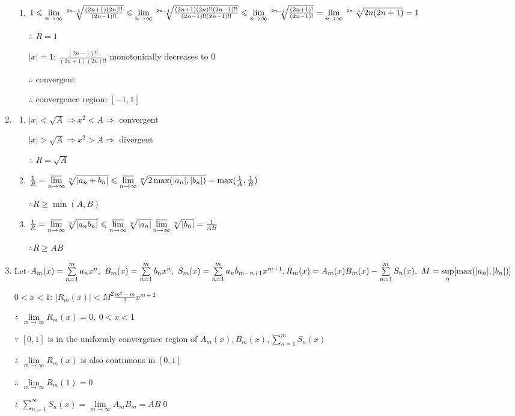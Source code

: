 \begin{enumerate}[1]
\begin{enumerate}[(1)]
        \item
        $1\leqslant \lim\limits_{n\rightarrow{\infty}}\sqrt[2n-1]{\frac{(2n+1)(2n)!!}{(2n-1)!!}}\leqslant \lim\limits_{n\rightarrow{\infty}}\sqrt[2n-1]{\frac{(2n+1)(2n)!!(2n-1)!!}{(2n-1)!!(2n-1)!!}}\leqslant\lim\limits_{n\rightarrow{\infty}}\sqrt[2n-1]{\frac{(2n+1)!}{(2n-1)!}}\\=\lim\limits_{n\rightarrow{\infty}}\sqrt[2n-1]{2n(2n+1)}=1$
        \par $\therefore$ $R=1$
        \par $|x|=1$: $\frac{(2n-1)!!}{(2n+1)(2n)!!}$ monotonically decreases to $0$
        \par $\therefore$ convergent
        \par $\therefore$ convergence region: $[-1,1]$
        \end{enumerate}

    \item
        \begin{enumerate}[(1)]
        \item
        $|x|<\sqrt{A}\Rightarrow x^2<A\Rightarrow$ convergent
        \par $|x|>\sqrt{A}\Rightarrow x^2>A\Rightarrow$ divergent
        \par $\therefore$ $R=\sqrt{A}$

        \item
        $\frac{1}{R}=\varlimsup \limits_{n\to \infty} \sqrt[n]{|a_n+b_n|} \leqslant \varlimsup \limits_{n\to \infty} \sqrt[n]{2\max(|a_n|,|b_n|)} = \max(\frac{1}{A},\frac{1}{B}) $
        \par $\therefore R \geqslant \min(A,B)$

        \item
        $\frac{1}{R}=\varlimsup \limits_{n\to \infty} \sqrt[n]{|a_nb_n|}\leqslant \varlimsup \limits_{n\to \infty} \sqrt[n]{|a_n|}  \varlimsup \limits_{n\to \infty} \sqrt[n]{|b_n|} = \frac{1}{AB}$
        \par $\therefore R \geqslant AB$ 
        \end{enumerate}

    \item
    Let $A_m(x)=\sum\limits_{n=1}^m a_n x^n,\ B_m(x)=\sum\limits_{n=1}^m b_n x^n,\ S_m(x)=\sum\limits_{n=1}^m a_nb_{m-n+1} x^{m+1},\\ R_m(x)=A_m(x)B_m(x)-\sum\limits_{n=1}^m S_n(x),\ M=\sup \limits_{n}[\max (|a_n|,|b_n|)] $
    \par $0<x<1$: $|R_m(x)|<M^2\frac{m^2-m}{2} x^{m+2}$
    \par $\therefore$ $\lim\limits_{m\rightarrow{\infty}} R_m(x)=0,\ 0<x<1$
    \par $\because$ $[0,1]$ is in the uniformly convergence region of $A_m(x),B_m(x),\sum\limits_{n=1}^m S_n(x)$
    \par $\therefore$ $\lim\limits_{m\rightarrow{\infty}} R_m(x)$ is also continuous in $[0,1]$
    \par $\therefore$ $\lim\limits_{m\rightarrow{\infty}} R_m(1)=0$
    \par $\therefore$ $\sum\limits_{n=1}^{\infty} S_n(x)=\lim\limits_{m\rightarrow{\infty}}A_mB_m=AB $\qed
    

\end{enumerate}
